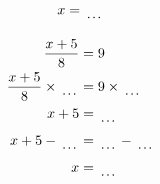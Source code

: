 \documentclass[12pt]{article}
\newcounter{minipagecount}
\begin{document}
\begin{multicols}{2}
\begin{minipage}[t]{0.45\textwidth}
\begin{align*}
        x &= \dotuline{\hspace{5mm}}\\
    \end{align*}
\end{minipage}\columnbreak
\noindent{(\theminipagecount)}\hspace{0.1mm} %
\begin{minipage}[t]{0.45\textwidth} %
    \vspace{-26pt}  %
    \raggedright %
    \begin{align*} %
        \frac{x + 5}{8} &= 9\\
        \frac{x + 5}{8} \times\dotuline{\hspace{5mm}} &= 9 \times\dotuline{\hspace{5mm}}\\
        x + 5 &= \dotuline{\hspace{5mm}}\\
        x + 5 - \dotuline{\hspace{5mm}} &= \dotuline{\hspace{5mm}} - \dotuline{\hspace{5mm}}\\
        x &= \dotuline{\hspace{5mm}}\\
    \end{align*}
\end{minipage} %
\noindent{(\theminipagecount)}\hspace{0.1mm} %
\begin{minipage}[t]{0.45\textwidth} %
    \vspace{-26pt}  %

\end{minipage}
\end{multicols}
\end{document}
